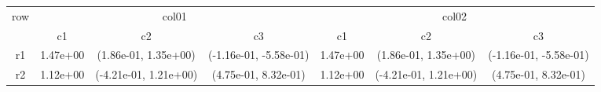\begin{tabular}{ccccccc}
\toprule
\multirow{2}{*}{row}&\multicolumn{3}{c}{col01}&\multicolumn{3}{c}{col02}\tabularnewline
\cmidrule(lr){2-4}
\cmidrule(lr){5-7}
&c1&c2&c3&c1&c2&c3\tabularnewline
\midrule
r1&1.47e+00& (1.86e-01, 1.35e+00)& (-1.16e-01, -5.58e-01)&1.47e+00& (1.86e-01, 1.35e+00)& (-1.16e-01, -5.58e-01)\tabularnewline
r2&1.12e+00& (-4.21e-01, 1.21e+00)& (4.75e-01, 8.32e-01)&1.12e+00& (-4.21e-01, 1.21e+00)& (4.75e-01, 8.32e-01)\tabularnewline
\bottomrule
\end{tabular}
